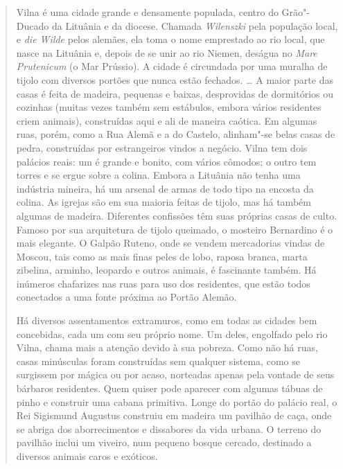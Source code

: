 \begin{quote}
Vilna é uma cidade grande e densamente populada, centro do Grão"-Ducado
da Lituânia e da diocese. Chamada \textit{Wilenszki} pela população local,
e \textit{die Wilde} pelos alemães, ela toma o nome emprestado ao rio
local, que nasce na Lituânia e, depois de se unir ao rio Niemen, deságua
no \textit{Mare Prutenicum} (o Mar Prússio). A cidade é circundada por uma
muralha de tijolo com diversos portões que nunca estão fechados.
\ldots{} A maior parte das casas é feita de madeira, pequenas e baixas,
desprovidas de dormitórios ou cozinhas (muitas vezes também sem
estábulos, embora vários residentes criem animais), construídas aqui e
ali de maneira caótica. Em algumas ruas, porém, como a Rua Alemã e a do
Castelo, alinham"-se belas casas de pedra, construídas por estrangeiros
vindos a negócio. Vilna tem dois palácios reais: um é grande e bonito,
com vários cômodos; o outro tem torres e se ergue sobre a colina. Embora
a Lituânia não tenha uma indústria mineira, há um arsenal de armas de
todo tipo na encosta da colina. As igrejas são em sua maioria feitas de
tijolo, mas há também algumas de madeira. Diferentes confissões têm suas
próprias casas de culto. Famoso por sua arquitetura de tijolo queimado,
o mosteiro Bernardino é o mais elegante. O Galpão Ruteno, onde se vendem
mercadorias vindas de Moscou, tais como as mais finas peles de lobo,
raposa branca, marta zibelina, arminho, leopardo e outros animais, é
fascinante também. Há inúmeros chafarizes nas ruas para uso dos
residentes, que estão todos conectados a uma fonte próxima ao Portão
Alemão.

Há diversos assentamentos extramuros, como em todas as cidades bem
concebidas, cada um com seu próprio nome. Um deles, engolfado pelo rio
Vilna, chama mais a atenção devido à sua pobreza. Como não há ruas,
casas minúsculas foram construídas sem qualquer sistema, como se
surgissem por mágica ou por acaso, norteadas apenas pela vontade de seus
bárbaros residentes. Quem quiser pode aparecer com algumas tábuas de
pinho e construir uma cabana primitiva. Longe do portão do palácio real,
o Rei Sigismund Augustus construiu em madeira um pavilhão de caça, onde
se abriga dos aborrecimentos e dissabores da vida urbana. O terreno do
pavilhão inclui um viveiro, num pequeno bosque cercado, destinado a
diversos animais caros e exóticos.

%


\end{quote}
